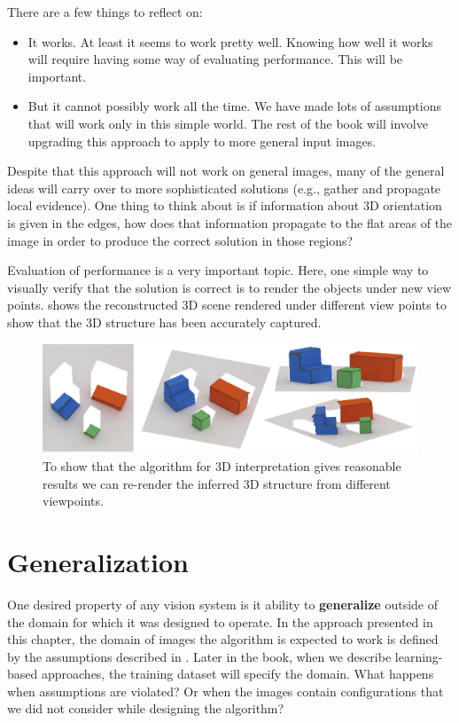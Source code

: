 There are a few things to reflect on: 
\begin{itemize}
\item It works. At least it seems to work pretty well. Knowing how well it works will require having some way of evaluating performance. This will be important.
\item But it cannot possibly work all the time. We have made lots of assumptions that will work only in this simple world. The rest of the book will involve upgrading this approach to apply to more general input images.
\end{itemize}

Despite that this approach will not work on general images, many of the general ideas will carry over to more sophisticated solutions (e.g., gather and propagate local evidence).  One thing to think about is if information about 3D orientation is given in the edges, how does that information propagate to the flat areas of the image in order to produce the correct solution in those regions? 


Evaluation of performance is a very important topic. Here, one simple way to visually verify that the solution is correct is to render the objects under new view points. \Fig{\ref{fig:views}} shows the reconstructed 3D scene rendered under different view points to show that the 3D structure has been accurately captured. 

\begin{figure}[!h]
\centerline{
\includegraphics[width=1\linewidth]{figures/simplesystem/views.pdf}
} 
\caption{To show that the algorithm for 3D interpretation gives reasonable results we can re-render the inferred 3D structure from different viewpoints.} 
\label{fig:views}
\end{figure}

\section{Generalization}

One desired property of any vision system is it ability to {\bf generalize} outside of the domain for which it was designed to operate. In the approach presented in this chapter, the domain of images the algorithm is expected to work is defined by the assumptions described in \sect{\ref{sec:algo_simple_world}}. Later in the book, when we describe learning-based approaches, the training dataset will specify the domain. 
What happens when assumptions are violated? Or when the images contain configurations that we did not consider while designing the algorithm?



